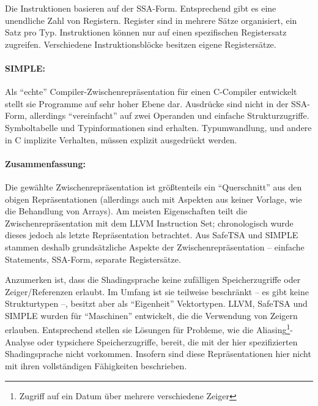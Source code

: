 \documentclass[twoside,a4paper,fleqn,12pt]{article}
\begin{document}
Die Instruktionen basieren auf der SSA-Form. Entsprechend gibt es eine unendliche Zahl von Registern.
Register sind in mehrere Sätze organisiert, ein Satz pro Typ. Instruktionen können nur auf einen
spezifischen Registersatz zugreifen. Verschiedene Instruktionsblöcke besitzen eigene Registersätze.


\paragraph{SIMPLE:} Als "`echte"' Compiler-Zwischenrepräsentation für einen C-Compiler entwickelt
stellt sie Programme auf sehr hoher Ebene dar. Ausdrücke sind nicht in der SSA-Form, allerdings
"`vereinfacht"' auf zwei Operanden und einfache Strukturzugriffe. Symboltabelle und Typinformationen
sind erhalten. Typumwandlung, und andere in C implizite Verhalten, müssen explizit ausgedrückt werden.


\paragraph{Zusammenfassung:}
Die gewählte Zwischenrepräsentation ist größtenteils ein "`Querschnitt"' aus den obigen Repräsentationen
(allerdings auch mit Aspekten aus keiner Vorlage, wie die Behandlung von Arrays). Am meisten Eigenschaften
teilt die Zwischenrepräsentation mit dem LLVM Instruction Set; chronologisch wurde dieses jedoch als letzte
Repräsentation betrachtet. Aus SafeTSA und SIMPLE stammen deshalb grundsätzliche Aspekte der Zwischenrepräsentation 
-- einfache Statements, SSA-Form, separate Registersätze.

Anzumerken ist, dass die Shadingsprache keine zufälligen Speicherzugriffe oder Zeiger/Referenzen erlaubt.
Im Umfang ist sie teilweise beschränkt -- es gibt keine Strukturtypen --, besitzt aber als "`Eigenheit"' Vektortypen.
LLVM, SafeTSA und SIMPLE wurden für "`Maschinen"' entwickelt, die die Verwendung von Zeigern erlauben. Entsprechend
stellen sie Lösungen für Probleme, wie die Aliasing\footnote{Zugriff auf ein Datum über mehrere verschiedene Zeiger}-Analyse oder typsichere Speicherzugriffe, bereit, die mit
der hier spezifizierten Shadingsprache nicht vorkommen. Insofern sind diese Repräsentationen hier nicht
mit ihren vollständigen Fähigkeiten beschrieben.
\end{document}
